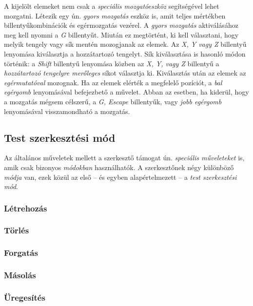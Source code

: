 A kijelölt elemeket nem csak a \emph{speciális mozgatóeszköz} segítségével lehet mozgatni. Létezik
egy ún. \emph{gyors mozgatás} eszköz is, amit teljes mértékben billentyűkombinációk és egérmozgatás
vezérel. A \emph{gyors mozgatás} aktiválásához meg kell nyomni a \emph{G} billentyűt. Miután ez
megtörtént, ki kell választani, hogy melyik tengely vagy sík mentén mozogjanak az elemek. Az
\emph{X, Y vagy Z} billentyű lenyomása kiválasztja a hozzátartozó tengelyt. Sík kiválasztása is
hasonló módon történik: a \emph{Shift} billentyű lenyomása közben az \emph{X, Y, vagy Z} billentyű
a \emph{hozzátartozó tengelyre merőleges} síkot választja ki. Kiválasztás után az elemek az
\emph{egérmutatóval} mozognak. Ha az elemek elérték a megfelelő pozíciót, a \emph{bal egérgomb}
lenyomásával befejezbető a művelet. Abban az esetben, ha kiderül, hogy a mozgatás mégsem célszerű,
a \emph{G, Escape} billentyűk, vagy \emph{jobb egérgomb} lenyomásával visszamondható a mozgatás.

\subsection{Test szerkesztési mód}

Az általános műveletek mellett a szerkesztő támogat ún. \emph{speciális műveleteket} is, amik csak
bizonyos \emph{módokban} használhatók. A szerkesztőnek négy különböző \emph{módja} van, ezek közül
az első -- és egyben alapértelmezett -- a \emph{test szerkesztési mód}.

\subsubsection{Létrehozás}

\subsubsection{Törlés}

\subsubsection{Forgatás}

\subsubsection{Másolás}

\subsubsection{Üregesítés}

